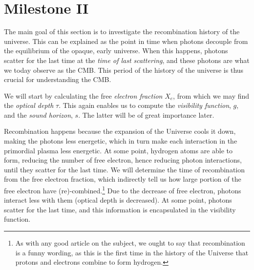 \section{Milestone II}\label{sec:m2}

The main goal of this section is to investigate the recombination history of the universe. This can be explained as the point in time when photons decouple from the equilibrium of the opaque, early universe.  When this happens, photons scatter for the last time at the \textit{time of last scattering}, and these photons are what we today observe as the CMB. This period of the history of the universe is thus crucial for understanding the CMB. 

We will start by calculating the free \textit{electron fraction} $X_e$, from which we may find the \textit{optical depth} $\tau$. This again enables us to compute the \textit{visibility function}, $g$, and the \textit{sound horizon}, $s$. The latter will be of great importance later. 

Recombination happens because the expansion of the Universe cools it down, making the photons less energetic, which in turn make each interaction in the primordial plasma less energetic. At some point, hydrogen atoms are able to form, reducing the number of free electron, hence reducing photon interactions, until they scatter for the last time. We will determine the time of recombination from the free electron fraction, which indirectly tell us how large portion of the free electron have (re)-combined.\footnote{As with any good article on the subject, we ought to say that recombination is a funny wording, as this is the first time in the history of the Universe that protons and electrons combine to form hydrogen.} Due to the decrease of free electron, photons interact less with them (optical depth is decreased). At some point, photons scatter for the last time, and this information is encapsulated in the visibility function. 






